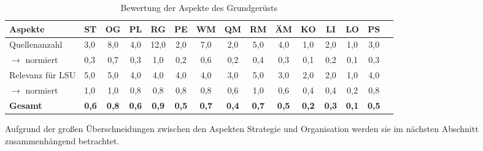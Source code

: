 \begin{table}[htbp]
\caption{Bewertung der Aspekte des Grundgerüsts}
\begin{center}
\begin{tabular}{llccccccccccccc}

\textbf{Aspekte} & \textbf{ST} & \textbf{OG} & \textbf{PL} & \textbf{RG} & \textbf{PE} & \textbf{WM} & \textbf{QM} & \textbf{RM} & \textbf{ÄM} & \textbf{KO} & \textbf{LI} & \textbf{LO} & \textbf{PS} \\ \hline
Quellenanzahl  & 3,0 & 8,0 & 4,0 & 12,0 & 2,0 & 7,0 & 2,0 & 5,0 & 4,0 & 1,0 & 2,0 & 1,0 & 3,0 \\ 
$\rightarrow$ normiert  & 0,3 & 0,7 & 0,3 & 1,0 & 0,2 & 0,6 & 0,2 & 0,4 & 0,3 & 0,1 & 0,2 & 0,1 & 0,3 \\ 
Relevanz für LSU  & 5,0 & 5,0 & 4,0 & 4,0 & 4,0 & 4,0 & 3,0 & 5,0 & 3,0 & 2,0 & 2,0 & 1,0 & 4,0 \\ 
$\rightarrow$ normiert &  1,0 & 1,0 & 0,8 & 0,8 & 0,8 & 0,8 & 0,6 & 1,0 & 0,6 & 0,4 & 0,4 & 0,2 & 0,8  \\ \hline  
\textbf{Gesamt} & \textbf{0,6} & \textbf{0,8} & \textbf{0,6} & \textbf{0,9} & \textbf{0,5} & \textbf{0,7} & \textbf{0,4} & \textbf{0,7} & \textbf{0,5} & \textbf{0,2} & \textbf{0,3} & \textbf{0,1} & \textbf{0,5} \\ 
\end{tabular}
\end{center}
\label{fig:auswahl_gg}
\end{table}




Aufgrund der großen Überschneidungen zwischen den Aspekten Strategie und Organisation werden sie im nächsten Abschnitt zusammenhängend betrachtet. 
